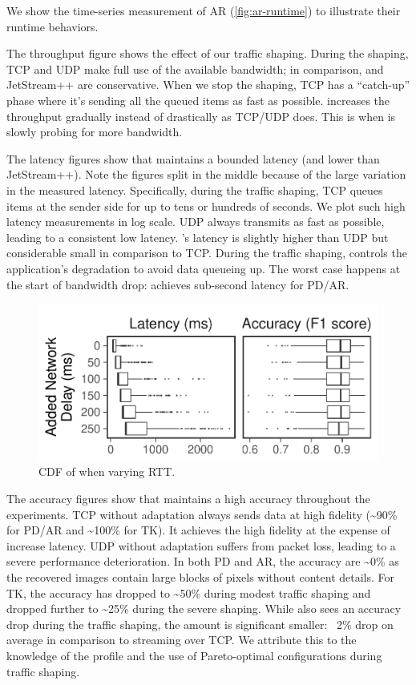  We show the time-series measurement of AR
(\autoref{fig:ar-runtime}) to illustrate their runtime behaviors.

The throughput figure shows the effect of our traffic shaping. During the
shaping, TCP and UDP make full use of the available bandwidth; in comparison,
\sysname{} and JetStream++ are conservative. When we stop the shaping, TCP has a
``catch-up'' phase where it's sending all the queued items as fast as
possible. \sysname{} increases the throughput gradually instead of drastically
as TCP/UDP does. This is when \sysname{} is slowly probing for more bandwidth.

The latency figures show that \sysname{} maintains a bounded latency (and lower
than JetStream++). Note the figures split in the middle because of the large
variation in the measured latency. Specifically, during the traffic shaping, TCP
queues items at the sender side for up to tens or hundreds of seconds. We plot
such high latency measurements in log scale. UDP always transmits as fast as
possible, leading to a consistent low latency. \sysname{}'s latency is slightly
higher than UDP but considerable small in comparison to TCP\@. During the
traffic shaping, \sysname{} controls the application's degradation to avoid data
queueing up. The worst case happens at the start of bandwidth drop: \sysname{}
achieves sub-second latency for PD/AR.

\begin{figure}
  \centering
  \includegraphics[width=.9\columnwidth]{figures/runtime_darknet-bench.pdf}
  \caption{CDF of \sysname{} when varying RTT.}
  \label{fig:ar-rtt}
\end{figure}

The accuracy figures show that \sysname{} maintains a high accuracy throughout
the experiments. TCP without adaptation always sends data at high fidelity
(\textasciitilde 90\% for PD/AR and \textasciitilde 100\% for TK). It achieves
the high fidelity at the expense of increase latency. UDP without adaptation
suffers from packet loss, leading to a severe performance deterioration.  In
both PD and AR, the accuracy are \textasciitilde 0\% as the recovered images
contain large blocks of pixels without content details. For TK, the accuracy has
dropped to \textasciitilde 50\% during modest traffic shaping and dropped
further to \textasciitilde 25\% during the severe shaping. While \sysname{} also
sees an accuracy drop during the traffic shaping, the amount is significant
smaller: ~2\% drop on average in comparison to streaming over TCP\@.  We
attribute this to the knowledge of the profile and the use of Pareto-optimal
configurations during traffic shaping.

